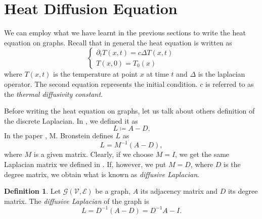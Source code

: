 \documentclass[12pt,a4paper]{report}
\theoremstyle{definition}
\newtheorem{definition}{Definition}[chapter]
\begin{document}
\section{Heat Diffusion Equation}
\label{sec:heat_equation}

We can employ what we have learnt in the previous sections to write the heat equation on graphs.
Recall that in general the heat equation is written as
\begin{equation}
\label{eq:heat_eq_classic}
\begin{cases}
    \partial_t T(x,t) = c \Delta T(x,t) \\
    T(x,0) = T_0 (x) 
\end{cases}
\end{equation}
where $T(x,t)$ is the temperature at point $x$ at time $t$ and $\Delta$ is the laplacian operator.
The second equation represents the initial condition.
$c$ is referred to as the \emph{thermal diffusivity constant}.

Before writing the heat equation on graphs, let us talk about others definition of the discrete Laplacian.
In , we defined it as 
\begin{equation*}
    L \coloneqq A - D .
\end{equation*}
In the paper \cite{Beyound_eucl_data}, M. Bronstein defines $L$ as
\begin{equation*}
    L = M^{-1} (A-D) ,
\end{equation*}
where $M$ is a given matrix.
Clearly, if we choose $M = I$, we get the same Laplacian matrix we defined in .
If, however, we put $M = D$, where $D$ is the degree matrix, we obtain what is known as \emph{diffusive Laplacian}.
\begin{definition}
\label{def:diffusive_laplacian}
Let $\mathcal{G}(\mathcal{V}, \mathcal{E})$ be a graph, $A$ its adjacency matrix and $D$ its degree matrix.
The \emph{diffusive Laplacian} of the graph is
\begin{equation*}
    L = D^{-1} (A - D) = D^{-1} A - I .
\end{equation*}
\end{definition}
\end{document}
